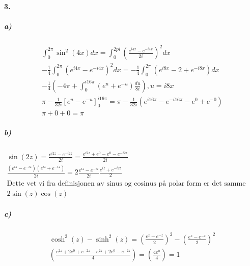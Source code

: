 \documentclass[11pt, A4paper, norsk]{article}
\begin{document}
		\paragraph{3.}
			\subparagraph{a)}
				\begin{gather}
\int_{0}^{2\pi} \sin^2(4x)dx = \int_{0}^{2pi} \left( \frac{e^{i4x} - e^{-i4x}}{2i} \right)^{2} dx \\
- \frac{1}{4} \int_{0}^{2\pi} \left( e^{i4x} - e^{-i4x} \right)^{2} dx = - \frac{1}{4} \int_{0}^{2\pi} \left( e^{i8x} - 2 + e^{-i8x} \right) dx \\
- \frac{1}{4} \left( -4\pi + \int_{0}^{i16\pi} (e^{u} + e^{-u}) \frac{du}{8i} \right), u = i8x \\
\pi - \frac{1}{32i} \left[ e^{u} - e^{-u} \right]_{0}^{i16\pi} = \pi - \frac{1}{32i} \left( e^{i16\pi} - e^{-i16\pi} - e^{0} + e^{-0} \right) \\
\pi + 0 + 0 = \pi
				\end{gather}









			\subparagraph{b)}
				\begin{gather}
\sin(2z) = \frac{e^{i2z} - e^{-i2z}}{2i} = \frac{e^{i2z} + e^{0} - e^{0} - e^{-i2z}}{2i} \\
\frac{\left(e^{iz} - e^{-iz}\right) \left(e^{iz} + e^{-iz}\right)}{2i} = 2 \frac{e^{iz} - e^{-iz}}{2i} \frac{e^{iz} + e^{-i2z}}{2} \\
\text{Dette vet vi fra definisjonen av sinus og cosinus på polar form er det samme som:} \nonumber \\
2 \sin(z) \cos(z)
				\end{gather}












			\subparagraph{c)}
				\begin{gather}
\cosh^{2}(z) - \sinh^{2}(z) = \left(\frac{e^{z} + e^{-z}}{2}\right)^{2} - \left(\frac{e^{z} - e^{-z}}{2}\right)^{2} \\
\left(\frac{e^{2z} + 2e^{0} + e^{-2z} - e^{2z} + 2e^{0} - e^{-2z}}{4}\right) = \left(\frac{4e^{0}}{4}\right) = 1
				\end{gather}
\end{document}
